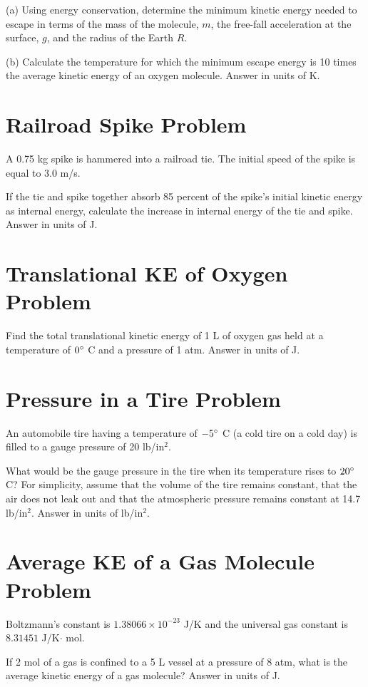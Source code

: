 \documentclass[../physics12.tex]{subfiles}
\begin{document}
(a) Using energy conservation, determine the minimum kinetic energy needed to escape in terms of the mass of the molecule, $m$, the free-fall acceleration at the surface, $g$, and the radius of the Earth $R$.

(b) Calculate the temperature for which the minimum escape energy is 10 times the average kinetic energy of an oxygen molecule. Answer in units of K.

\section{Railroad Spike Problem}
A 0.75 kg spike is hammered into a railroad tie. The initial speed of the spike is equal to 3.0 m/s.

If the tie and spike together absorb 85 percent of the spike's initial kinetic energy as internal energy, calculate the increase in internal energy of the tie and spike. Answer in units of J.

\section{Translational KE of Oxygen Problem}
Find the total translational kinetic energy of 1 L of oxygen gas held at a temperature of $0\degree$ C and a pressure of 1 atm. Answer in units of J.

\section{Pressure in a Tire Problem}
An automobile tire having a temperature of $-5\degree$ C (a cold tire on a cold day) is filled to a gauge pressure of 20 lb/in$^2$.

What would be the gauge pressure in the tire when its temperature rises to $20\degree$ C? For simplicity, assume that the 
volume of the tire remains constant, that the air does not leak out and that the atmospheric pressure remains constant at 14.7 lb/in$^2$. Answer in units of lb/in$^2$.

\section{Average KE of a Gas Molecule Problem}
Boltzmann's constant is $1.38066\times 10^{-23}$ J/K and the universal gas constant is $8.31451$ J/K$\cdot$ mol.

If 2 mol of a gas is confined to a 5 L vessel at a pressure of 8 atm, what is the average kinetic energy of a gas molecule? Answer in units of J.
\end{document}
